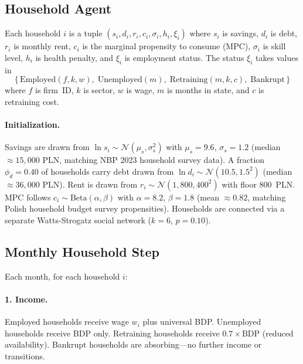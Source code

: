 \documentclass[12pt,a4paper]{article}
\begin{document}
\subsection{Household Agent}
\label{sec:household}

Each household $i$ is a tuple
$(s_i, d_i, r_i, c_i, \sigma_i, h_i, \xi_i)$ where $s_i$ is savings,
$d_i$ is debt, $r_i$ is monthly rent, $c_i$ is the marginal propensity
to consume (MPC), $\sigma_i$ is skill level, $h_i$ is health penalty,
and $\xi_i$ is employment status. The status $\xi_i$ takes values in
\[
  \bigl\{\,\text{Employed}(f, k, w),\;
  \text{Unemployed}(m),\;
  \text{Retraining}(m, k, c),\;
  \text{Bankrupt}\,\bigr\}
\]
where $f$ is firm~ID, $k$ is sector, $w$ is wage, $m$ is months in
state, and $c$ is retraining cost.

\paragraph{Initialization.} Savings are drawn from
$\ln s_i \sim \mathcal{N}(\mu_s, \sigma_s^2)$ with $\mu_s = 9.6$,
$\sigma_s = 1.2$ (median $\approx 15{,}000$ PLN, matching NBP 2023
household survey data). A fraction $\phi_d = 0.40$ of households carry
debt drawn from $\ln d_i \sim \mathcal{N}(10.5, 1.5^2)$ (median
$\approx 36{,}000$ PLN). Rent is drawn from
$r_i \sim \mathcal{N}(1{,}800, 400^2)$ with floor 800~PLN. MPC follows
$c_i \sim \text{Beta}(\alpha, \beta)$ with $\alpha = 8.2$,
$\beta = 1.8$ (mean $\approx 0.82$, matching Polish household budget
survey propensities). Households are connected via a separate
Watts-Strogatz social network ($k = 6$, $p = 0.10$).

\subsection{Monthly Household Step}
\label{sec:hh-step}

Each month, for each household $i$:

\paragraph{1. Income.} Employed households receive wage $w_i$ plus
universal BDP. Unemployed households receive BDP only. Retraining
households receive $0.7 \times \text{BDP}$ (reduced availability).
Bankrupt households are absorbing---no further income or transitions.
\end{document}
